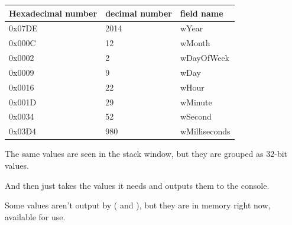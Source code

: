 \begin{center}
\begin{tabular}{ | l | l | l | }
\hline
\headercolor{} Hexadecimal number & 
\headercolor{} decimal number & 
\headercolor{} field name \\
\hline
0x07DE & 2014	& wYear \\
\hline
0x000C & 12	& wMonth \\
\hline
0x0002 & 2	& wDayOfWeek \\
\hline
0x0009 & 9	& wDay \\
\hline
0x0016 & 22	& wHour \\
\hline
0x001D & 29	& wMinute \\
\hline
0x0034 & 52	& wSecond \\
\hline	
0x03D4 & 980	& wMilliseconds \\
\hline
\end{tabular}
\end{center}

The same values are seen in the stack window, but they are grouped as 32-bit values.

And then \printf just takes the values it needs and outputs them to the console.

Some values aren't output by \printf  ( and ), 
but they are in memory right now, available for use.

